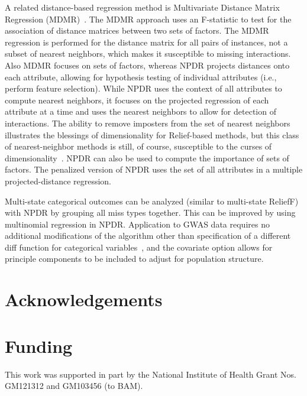 \documentclass[10pt]{article}
\begin{document}
A related distance-based regression method is Multivariate Distance Matrix Regression (MDMR)~\cite{schork12}. The MDMR approach uses an F-statistic to test for the association of distance matrices between two sets of factors. The MDMR regression is performed for the distance matrix for all pairs of instances, not a subset of nearest neighbors, which makes it susceptible to missing interactions. Also MDMR focuses on sets of factors, whereas NPDR projects distances onto each attribute, allowing for hypothesis testing of individual attributes (i.e., perform feature selection). While NPDR uses the context of all attributes to compute nearest neighbors, it focuses on the projected regression of each attribute at a time and uses the nearest neighbors to allow for detection of interactions. The ability to remove imposters from the set of nearest neighbors illustrates the blessings of dimensionality for Relief-based methods, but this class of nearest-neighbor methods is still, of course, susceptible to the curses of dimensionality~\cite{CoD}. NPDR can also be used to compute the importance of sets of factors. The penalized version of NPDR uses the set of all attributes in a multiple projected-distance regression. 

Multi-state categorical outcomes can be analyzed (similar to multi-state ReliefF) with NPDR by grouping all miss types together. This can be improved by using multinomial regression in NPDR. Application to GWAS data requires no additional modifications of the algorithm other than specification of a different diff function for categorical variables~\cite{titv}, and the covariate option allows for principle components to be included to adjust for population structure. 

\section*{Acknowledgements}

\section*{Funding}
This work was supported in part by the National Institute of Health Grant Nos. GM121312 and GM103456 (to BAM). 


%

\end{document}
